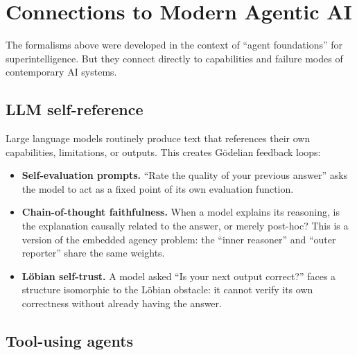 \documentclass[11pt,a4paper]{article}
\theoremstyle{definition}
\theoremstyle{remark}
\begin{document}
\section{Connections to Modern Agentic AI}\label{sec:connections}

The formalisms above were developed in the context of ``agent
foundations'' for superintelligence.  But they connect directly to
capabilities and failure modes of contemporary AI systems.

\subsection{LLM self-reference}

Large language models routinely produce text that references their own
capabilities, limitations, or outputs.  This creates G\"odelian
feedback loops:
\begin{itemize}
  \item \textbf{Self-evaluation prompts.}  ``Rate the quality of your
    previous answer'' asks the model to act as a fixed point of its own
    evaluation function.
  \item \textbf{Chain-of-thought faithfulness.}  When a model explains
    its reasoning, is the explanation causally related to the answer, or
    merely post-hoc?  This is a version of the embedded agency problem:
    the ``inner reasoner'' and ``outer reporter'' share the same
    weights.
  \item \textbf{L\"obian self-trust.}  A model asked ``Is your next
    output correct?'' faces a structure isomorphic to the L\"obian
    obstacle: it cannot verify its own correctness without already
    having the answer.
\end{itemize}

\subsection{Tool-using agents}
\end{document}
